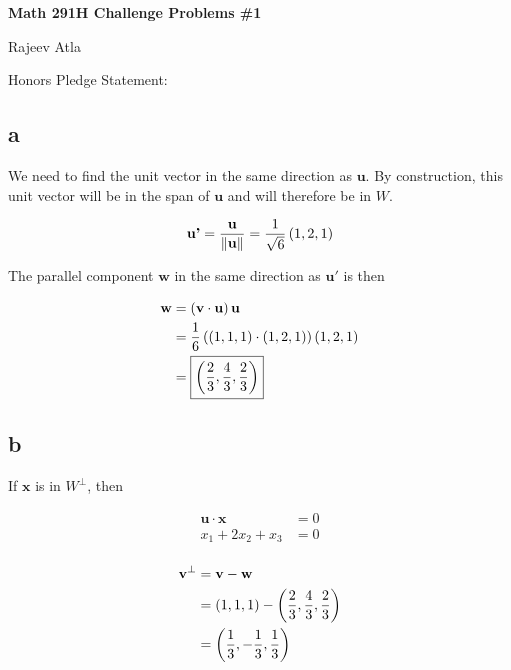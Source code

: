 \documentclass{article}
\begin{document}
\begin{center}
    \Large \textbf{Math 291H Challenge Problems \#1}
\end{center}
\begin{center}
    \Large Rajeev Atla
\end{center}


Honors Pledge Statement: 

\subsection*{a}


We need to find the unit vector in the same direction as $\bm{u}$.
By construction, this unit vector will be in the span of $\bm{u}$ and will therefore be in $W$.

$$
\textbf{u'} = \frac{\textbf{u}}{\left\lVert\textbf{u}\right\rVert} = \frac{1}{\sqrt{6}} \left ( 1, 2, 1 \right)
$$

The parallel component $\bm{w}$ in the same direction as $\bm{u'}$ is then

\begin{align*}
  \textbf{w} &= \left ( \textbf{v} \cdot \textbf{u} \right) \textbf{u} \\
         &= \frac{1}{6} \left ( \left ( 1, 1, 1 \right) \cdot \left ( 1, 2, 1 \right) \right) \left ( 1, 2, 1 \right) \\
         &= \boxed{\left ( \frac{2}{3}, \frac{4}{3}, \frac{2}{3} \right)} \\
\end{align*}

\subsection*{b}

If $\bm{x}$ is in $W^{\perp}$, then

\begin{align*}
  \bm{u} \cdot \bm{x} &= 0 \\
  x_1 + 2x_2 + x_3 &= 0 \\
\end{align*}

\begin{align*}
  \textbf{v}^{\perp} &= \textbf{v} - \textbf{w} \\
                 &= \left ( 1, 1, 1 \right) - \left ( \frac{2}{3}, \frac{4}{3}, \frac{2}{3} \right) \\
                 &= \left ( \frac{1}{3}, -\frac{1}{3}, \frac{1}{3}  \right) \\
\end{align*}
\end{document}
